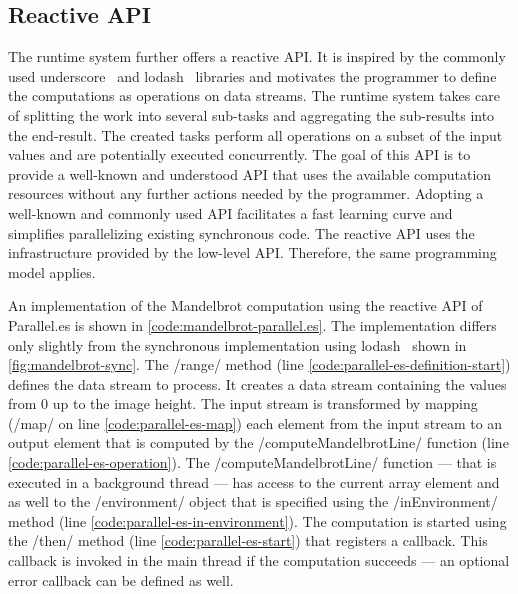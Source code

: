 \subsection{Reactive API}
The runtime system further offers a reactive API. It is inspired by the commonly used underscore~\cite{underscorejs} and lodash~\cite{lodash} libraries and motivates the programmer to define the computations as operations on data streams. The runtime system takes care of splitting the work into several sub-tasks and aggregating the sub-results into the end-result. The created tasks perform all operations on a subset of the input values and are potentially executed concurrently. The goal of this API is to provide a well-known and understood API that uses the available computation resources without any further actions needed by the programmer. Adopting a well-known and commonly used API facilitates a fast learning curve and simplifies parallelizing existing synchronous code. The reactive API uses the infrastructure provided by the low-level API. Therefore, the same programming model applies.


 An implementation of the Mandelbrot computation using the reactive API of Parallel.es is shown in \cref{code:mandelbrot-parallel.es}. The implementation differs only slightly from the synchronous implementation using lodash~\cite{lodash} shown in \cref{fig:mandelbrot-sync}. The \javascriptinline/range/ method (line \ref{code:parallel-es-definition-start}) defines the data stream to process. It creates a data stream containing the values from 0 up to the image height. The input stream is transformed by mapping (\javascriptinline/map/ on line \ref{code:parallel-es-map}) each element from the input stream to an output element that is computed by the \javascriptinline/computeMandelbrotLine/ function (line \ref{code:parallel-es-operation}). The \javascriptinline/computeMandelbrotLine/ function --- that is executed in a background thread --- has access to the current array element and as well to the \javascriptinline/environment/ object that is specified using the \javascriptinline/inEnvironment/ method (line \ref{code:parallel-es-in-environment}). The computation is started using the \javascriptinline/then/ method (line \ref{code:parallel-es-start}) that registers a callback. This callback is invoked in the main thread if the computation succeeds — an optional error callback can be defined as well.
 
